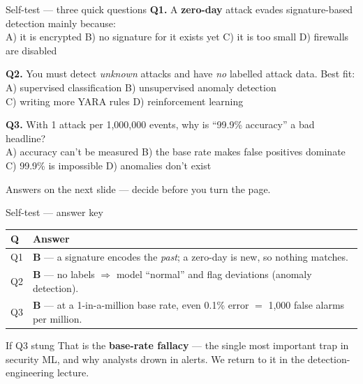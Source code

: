 \documentclass[aspectratio=169,10pt]{beamer}
\newcommand{\term}[1]{{\color{mlink}\textbf{#1}}}         %
\begin{document}
\begin{frame}{Self-test --- three quick questions}
  \footnotesize
  \textbf{Q1.} A \term{zero-day} attack evades signature-based detection mainly
  because:\\
  \quad A) it is encrypted \quad B) no signature for it exists yet \quad
  C) it is too small \quad D) firewalls are disabled

  \vspace{0.7em}
  \textbf{Q2.} You must detect \emph{unknown} attacks and have \emph{no}
  labelled attack data. Best fit:\\
  \quad A) supervised classification \quad B) unsupervised anomaly detection\\
  \quad C) writing more YARA rules \quad D) reinforcement learning

  \vspace{0.7em}
  \textbf{Q3.} With 1 attack per 1{,}000{,}000 events, why is ``99.9\% accuracy''
  a bad headline?\\
  \quad A) accuracy can't be measured \quad
  B) the base rate makes false positives dominate\\
  \quad C) 99.9\% is impossible \quad D) anomalies don't exist

  \vspace{0.6em}
  {\footnotesize\color{midgray}Answers on the next slide --- decide before you
  turn the page.}
\end{frame}

\begin{frame}{Self-test --- answer key}
  \small
  \begin{tabular}{ll}
    \toprule \textbf{Q} & \textbf{Answer}\\ \midrule
    Q1 & \textbf{B} --- a signature encodes the \emph{past}; a zero-day is new, so nothing matches.\\
    Q2 & \textbf{B} --- no labels $\Rightarrow$ model ``normal'' and flag deviations (anomaly detection).\\
    Q3 & \textbf{B} --- at a 1-in-a-million base rate, even 0.1\% error $=$ 1{,}000 false alarms per million.\\
    \bottomrule
  \end{tabular}
  \vfill
  \begin{block}{\small If Q3 stung}
    \small That is the \term{base-rate fallacy} --- the single most important trap
    in security ML, and why analysts drown in alerts. We return to it in the
    detection-engineering lecture.
  \end{block}
\end{frame}
\end{document}
